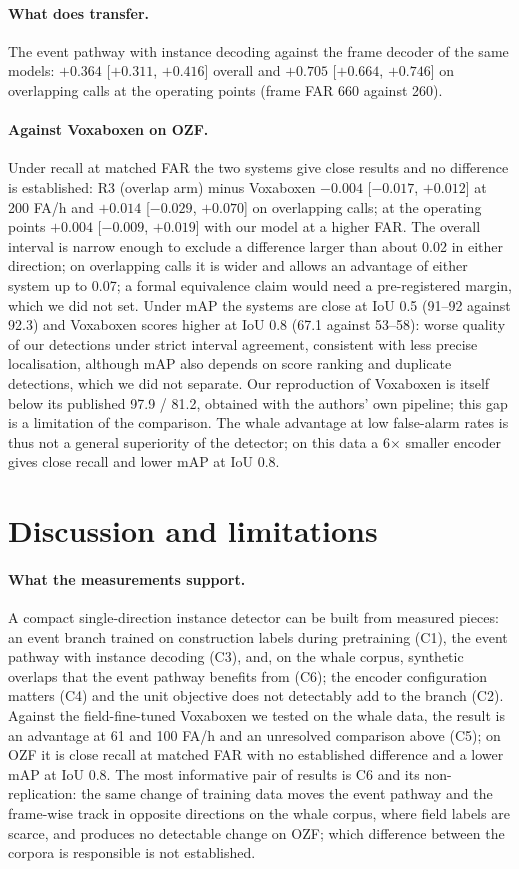 \documentclass[10pt,twocolumn]{article}
\begin{document}
\paragraph{What does transfer.} The event pathway with instance decoding against the frame decoder of the same models: $+0.364$ [$+0.311$, $+0.416$] overall and $+0.705$ [$+0.664$, $+0.746$] on overlapping calls at the operating points (frame FAR 660 against 260).
\paragraph{Against Voxaboxen on OZF.} Under recall at matched FAR the two systems give close results and no difference is established: R3 (overlap arm) minus Voxaboxen $-0.004$ [$-0.017$, $+0.012$] at 200 FA/h and $+0.014$ [$-0.029$, $+0.070$] on overlapping calls; at the operating points $+0.004$ [$-0.009$, $+0.019$] with our model at a higher FAR. The overall interval is narrow enough to exclude a difference larger than about 0.02 in either direction; on overlapping calls it is wider and allows an advantage of either system up to 0.07; a formal equivalence claim would need a pre-registered margin, which we did not set. Under mAP the systems are close at IoU 0.5 (91--92 against 92.3) and Voxaboxen scores higher at IoU 0.8 (67.1 against 53--58): worse quality of our detections under strict interval agreement, consistent with less precise localisation, although mAP also depends on score ranking and duplicate detections, which we did not separate. Our reproduction of Voxaboxen is itself below its published 97.9 / 81.2, obtained with the authors' own pipeline; this gap is a limitation of the comparison. The whale advantage at low false-alarm rates is thus not a general superiority of the detector; on this data a 6$\times$ smaller encoder gives close recall and lower mAP at IoU 0.8.

\section{Discussion and limitations}
\paragraph{What the measurements support.} A compact single-direction instance detector can be built from measured pieces: an event branch trained on construction labels during pretraining (C1), the event pathway with instance decoding (C3), and, on the whale corpus, synthetic overlaps that the event pathway benefits from (C6); the encoder configuration matters (C4) and the unit objective does not detectably add to the branch (C2). Against the field-fine-tuned Voxaboxen we tested on the whale data, the result is an advantage at 61 and 100 FA/h and an unresolved comparison above (C5); on OZF it is close recall at matched FAR with no established difference and a lower mAP at IoU 0.8. The most informative pair of results is C6 and its non-replication: the same change of training data moves the event pathway and the frame-wise track in opposite directions on the whale corpus, where field labels are scarce, and produces no detectable change on OZF; which difference between the corpora is responsible is not established.
\end{document}
